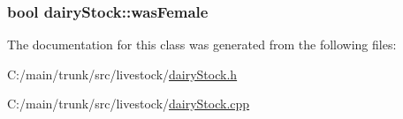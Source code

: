 \label{classdairy_stock_aafba61b39765bdecf0a0e05281e5740c}
\hypertarget{classdairy_stock_a4d15475e1ceb1b1108df48f0ed64b41e}{
\subsubsection[{wasFemale}]{\setlength{\rightskip}{0pt plus 5cm}bool {\bf dairyStock::wasFemale}}}
\label{classdairy_stock_a4d15475e1ceb1b1108df48f0ed64b41e}


The documentation for this class was generated from the following files:\begin{DoxyCompactItemize}
\item 
C:/main/trunk/src/livestock/\hyperlink{dairy_stock_8h}{dairyStock.h}\item 
C:/main/trunk/src/livestock/\hyperlink{dairy_stock_8cpp}{dairyStock.cpp}\end{DoxyCompactItemize}
